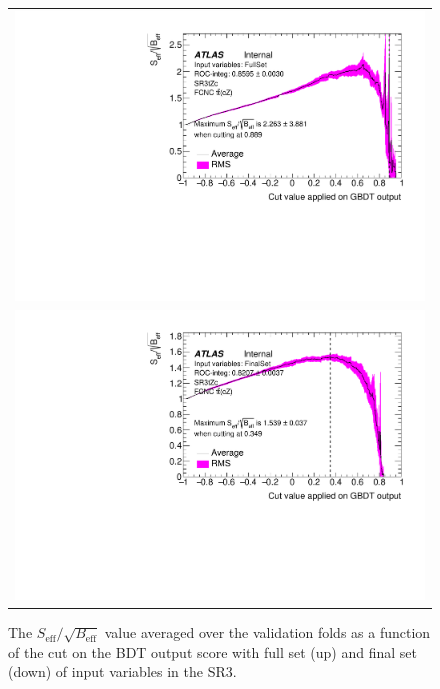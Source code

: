\begin{figure}[!htbp]
	\centering
	\begin{tabular}{c}
		\includegraphics[width=.65\textwidth]{Chapters/CH5/figures/SR3_UsingSMT/BDT/FullSet/CutEff_FullSet}\\
		\includegraphics[width=.65\textwidth]{Chapters/CH5/figures/SR3_UsingSMT/BDT/FinalSet/CutEff_FinalSet}
	\end{tabular}
	\caption{ The $S_{\text{eff}}/\sqrt{B_{\text{eff}}}$ value averaged over the validation folds as a function of the cut on the BDT output score with full set (up) and final set (down) of input variables in the SR3.}
	\label{app:BDT:fig:SR3:CutEff}
\end{figure}

